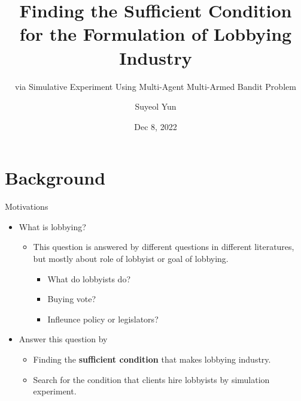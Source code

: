 \documentclass{beamer}
\begin{document}
	\title[]{Finding the Sufficient Condition for the Formulation of Lobbying Industry}
	\subtitle{via Simulative Experiment Using Multi-Agent Multi-Armed Bandit Problem}
	\author[Suyeol Yun]{Suyeol Yun}
	\date{Dec 8, 2022}
	\frame{\titlepage}
	\section{Background}

	\begin{frame}{Motivations}
		\begin{itemize}
			\item What is lobbying?
			\begin{itemize}
				\item This question is answered by different questions in different literatures, but mostly about role of lobbyist or goal of lobbying.
				\begin{itemize}
					\item What do lobbyists do? 
					\item Buying vote? 
					\item Infleunce policy or legislators?
				\end{itemize}
			\end{itemize}
		\end{itemize}
		\begin{itemize}
			\item Answer this question by
			\begin{itemize}
				\item Finding the \textbf{sufficient condition} that makes lobbying industry.					
				\item Search for the condition that clients hire lobbyists by simulation experiment.				
			\end{itemize}
		\end{itemize}
	\end{frame}
\end{document}
